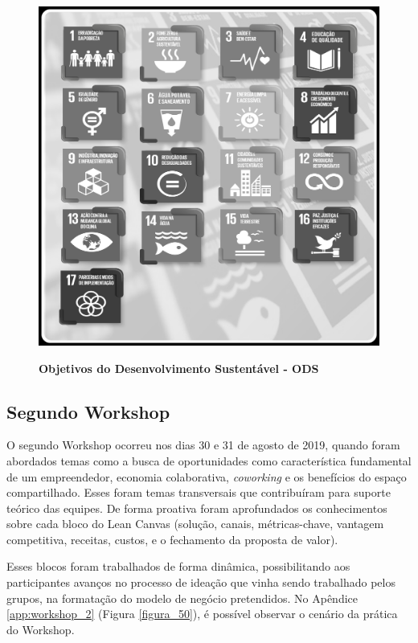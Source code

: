 \begin{figure}[H]
\centering
\caption{\textbf{Objetivos do Desenvolvimento Sustentável - ODS}}
\includegraphics[scale=0.1]{Imagens/ODS_GERAL.png}
\label{fig:ods}
\end{figure}


\subsection{Segundo Workshop}


O segundo Workshop ocorreu nos dias 30 e 31 de agosto de 2019, quando foram abordados temas como a busca de oportunidades como característica fundamental de um empreendedor, economia colaborativa, \textit{coworking} e os benefícios do espaço compartilhado. Esses foram temas transversais que contribuíram para suporte teórico das equipes. De forma proativa foram aprofundados os conhecimentos sobre cada bloco do Lean Canvas (solução, canais, métricas-chave, vantagem competitiva, receitas, custos, e o fechamento da proposta de valor). 

Esses blocos foram trabalhados de forma dinâmica, possibilitando aos participantes avanços no processo de ideação que vinha sendo trabalhado pelos grupos, na formatação do modelo de negócio pretendidos. No Apêndice \ref{app:workshop_2}  (Figura \ref{figura_50}), 
é possível observar o cenário da prática do Workshop.
 


